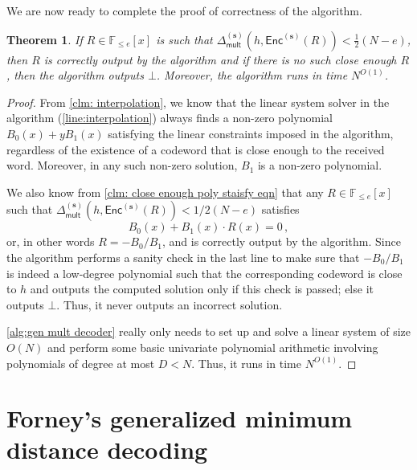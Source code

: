 \documentclass{article}
\newtheorem{theorem}{Theorem}\newtheorem{lemma}[theorem]{Lemma}\newtheorem{proposition}[theorem]{Proposition}\newtheorem{corollary}[theorem]{Corollary}\newtheorem{definition}[theorem]{Definition}\newtheorem{claim}[theorem]{Claim}\newtheorem{remark}[theorem]{Remark}\newtheorem{observation}[theorem]{Observation}
\def\Field{\mathbb{F}}
\let\F\Field
\newcommand{\enc}{{\mathsf{Enc}}}
\newcommand{\Delm}{\Delta_{\mathsf{mult}}}
\newcommand{\sbar}{\mathbf{s}}
\begin{document}
	We are now ready to complete the proof of correctness of the algorithm. %
	\begin{theorem}\label{thm:correctness of generalized univariate multiplicity code decoder}
		If $R \in \F_{\leq e}[x]$ is such that $\Delm^{(\sbar)}(h,\enc^{(\sbar)}(R)) < \frac{1}{2}(N - e)$, 
		then $R$ is correctly output by the algorithm and  if there is no such
		close enough $R$, then the algorithm outputs $\bot$. Moreover, the algorithm runs in time $N^{O(1)}$. 
	\end{theorem}
	\begin{proof}
		From \autoref{clm: interpolation}, we know that the linear system solver in the algorithm (\cref{line:interpolation})  always finds a non-zero polynomial $B_0(x) + yB_1(x)$ satisfying the linear constraints imposed in the algorithm, regardless of the existence of a codeword that is close enough to the received word. Moreover, in any such non-zero solution, $B_1$ is a non-zero polynomial. 
		
		We also know from \autoref{clm: close enough poly staisfy eqn} that any $R \in \F_{\leq e}[x]$ such that $\Delm^{(\sbar)}(h,\enc^{(\sbar)}(R)) < 1/2(N -e)$ satisfies
		\[
		B_0(x) + B_1(x)\cdot R(x) = 0 \, ,
		\]
		or, in other words $R = -B_0/B_1$, and is correctly output by the algorithm. 
		Since the algorithm performs a sanity check in the last line to make sure that $-B_0/B_1$ is indeed a low-degree polynomial such that the corresponding codeword is close to $h$ and outputs the computed solution only if this check is passed; else it outputs $\bot$. Thus, it never outputs an incorrect solution. 
		
		\cref{alg:gen mult decoder} really only needs to set up and solve a linear system of size $O(N)$ and perform some basic univariate polynomial arithmetic involving polynomials of degree at most $D < N$. Thus, it runs in time $N^{O(1)}$. 
	\end{proof}
	
	
	\section{Forney's generalized minimum distance decoding}\label{sec:forney}
	
\end{document}
